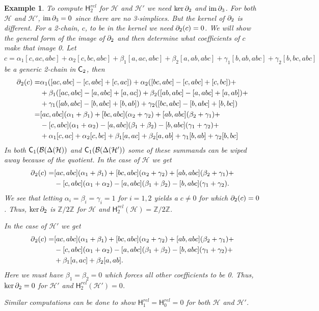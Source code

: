 \documentclass{amsart}
\newtheorem{example}[theorem]{Example}
\newcommand{\Z}{\mathbb{Z}}
\newcommand{\Cgroup}        {\mm{\sf C}}
\newcommand{\Hgroup}	     {\mathsf{H}}
\renewcommand{\hom}[2]{\Hgroup_{#2}^{#1}}
\renewcommand{\H}{\mathcal{H}}
\newcommand{\bary}{\mathcal{B}}
\DeclareMathOperator{\im}{im}
\newcommand{\bdr}{\mm{\mathrm{\partial}}}
\newcommand {\mm}[1]        {\ifmmode{#1}\else{\mbox{\(#1\)}}\fi}
\begin{document}
\begin{example}
To compute $\hom{rel}{2}$ for $\H$ and $\H'$ we need $\ker\bdr_2$ and $\im\bdr_3$. For both $\H$ and $\H'$, $\im\bdr_3=0$ since there are no 3-simplices. But the kernel of $\bdr_2$ is different. For a 2-chain, $c$, to be in the kernel we need $\bdr_2(c) = 0$. We will show the general form of the image of $\bdr_2$ and then determine what coefficients of $c$ make that image 0. Let $c=\alpha_1 [c, ac, abc] + \alpha_2 [c, bc, abc] + \beta_1 [a, ac, abc] + \beta_2 [a, ab, abc] + \gamma_1 [b, ab, abc] + \gamma_2 [b, bc, abc]$ be a generic 2-chain in $\Cgroup_2$, then
\begin{align*}
    \bdr_2(c) =& \alpha_1 ( [ac, abc]-[c, abc]+[c, ac])+\alpha_2 ( [bc, abc]-[c, abc]+[c, bc]) +\\
     &+\beta_1 ( [ac, abc]-[a, abc]+[a, ac])+\beta_2 ( [ab, abc]-[a, abc]+[a, ab]) +\\
     &+\gamma_1( [ab, abc]-[b, abc]+[b, ab])+\gamma_2( [bc, abc]-[b, abc]+[b, bc])\\
    =& [ac, abc](\alpha_1+\beta_1) + [bc, abc](\alpha_2+\gamma_2) + [ab, abc](\beta_2+\gamma_1)+\\
     &-[c, abc](\alpha_1+\alpha_2) -[a, abc](\beta_1+\beta_2) -[b, abc](\gamma_1+\gamma_2)+\\
     &+\alpha_1[c, ac] + \alpha_2[c, bc] + \beta_1[a, ac] + \beta_2[a, ab] + \gamma_1[b, ab] + \gamma_2[b, bc]
\end{align*}
In both $\Cgroup_1(\bary(\Delta(\H))$ and $\Cgroup_1(\bary(\Delta(\H'))$ some of these summands can be wiped away because of the quotient. In the case of $\H$ we get
\begin{align*}
\bdr_2(c) =& [ac, abc](\alpha_1+\beta_1) + [bc, abc](\alpha_2+\gamma_2) + [ab, abc](\beta_2+\gamma_1) + \\
  &-[c, abc](\alpha_1+\alpha_2) -[a, abc](\beta_1+\beta_2) -[b, abc](\gamma_1+\gamma_2).
\end{align*}
We see that letting $\alpha_i=\beta_i=\gamma_i=1$ for $i=1,2$ yields a $c\neq0$ for which $\bdr_2(c)=0$. Thus, $\ker\bdr_2$ is $\Z/2\Z$ for $\H$ and $\hom{rel}{2}(\H) = \Z/2\Z$.

In the case of $\H'$ we get 
\begin{align*}
\bdr_2(c) =& [ac, abc](\alpha_1+\beta_1) + [bc, abc](\alpha_2+\gamma_2) + [ab, abc](\beta_2+\gamma_1) + \\
  &-[c, abc](\alpha_1+\alpha_2) -[a, abc](\beta_1+\beta_2) -[b, abc](\gamma_1+\gamma_2) + \\
  &+\beta_1[a, ac] + \beta_2[a, ab].
\end{align*}
Here we must have $\beta_1=\beta_2=0$ which forces all other coefficients to be 0. Thus, $\ker\bdr_2=0$ for $\H'$ and $\hom{rel}{2}(\H') = 0$.

Similar computations can be done to show $\hom{rel}{1} = \hom{rel}{0} = 0$ for both $\H$ and $\H'$.
\end{example}
\end{document}
